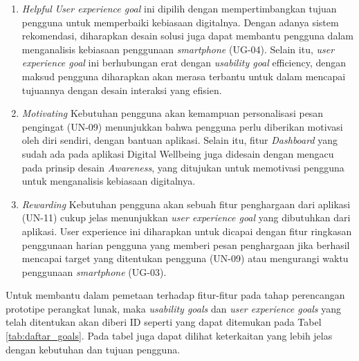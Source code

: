 \begin{enumerate}
  \item \textit{Helpful}
  \subitem \textit{User experience goal} ini dipilih dengan mempertimbangkan tujuan pengguna untuk memperbaiki kebiasaan digitalnya. Dengan adanya sistem rekomendasi, diharapkan desain solusi juga dapat membantu pengguna dalam menganalisis kebiasaan penggunaan \textit{smartphone} (UG-04). Selain itu, \textit{user experience goal} ini berhubungan erat dengan \textit{usability goal} efficiency, dengan maksud pengguna diharapkan akan merasa terbantu untuk dalam mencapai tujuannya dengan desain interaksi yang efisien.

  \item \textit{Motivating}
  \subitem Kebutuhan pengguna akan kemampuan personalisasi pesan pengingat (UN-09) menunjukkan bahwa pengguna perlu diberikan motivasi oleh diri sendiri, dengan bantuan aplikasi. Selain itu, fitur \textit{Dashboard} yang sudah ada pada aplikasi Digital Wellbeing juga didesain dengan mengacu pada prinsip desain \textit{Awareness}, yang ditujukan untuk memotivasi pengguna untuk menganalisis kebiasaan digitalnya.

  \item \textit{Rewarding}
  \subitem Kebutuhan pengguna akan sebuah fitur penghargaan dari aplikasi (UN-11) cukup jelas menunjukkan \textit{user experience goal} yang dibutuhkan dari aplikasi. User experience ini diharapkan untuk dicapai dengan fitur ringkasan penggunaan harian pengguna yang memberi pesan penghargaan jika berhasil mencapai target yang ditentukan pengguna (UN-09) atau mengurangi waktu penggunaan \textit{smartphone} (UG-03).
  
\end{enumerate}

Untuk membantu dalam pemetaan terhadap fitur-fitur pada tahap perencangan prototipe perangkat lunak, maka \textit{usability goals} dan \textit{user experience goals} yang telah ditentukan akan diberi ID seperti yang dapat ditemukan pada Tabel \ref{tab:daftar_goals}. Pada tabel juga dapat dilihat keterkaitan yang lebih jelas dengan kebutuhan dan tujuan pengguna.

